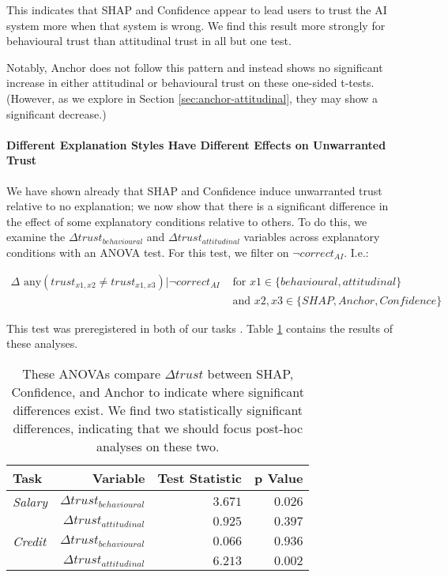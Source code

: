 This indicates that SHAP and Confidence appear to lead users to trust the AI system more when that system is wrong. We find this result more strongly for behavioural trust than attitudinal trust in all but one test.

Notably, Anchor does not follow this pattern and instead shows no significant increase in either attitudinal or behavioural trust on these one-sided t-tests. (However, as we explore in Section \ref{sec:anchor-attitudinal}, they may show a significant decrease.)

\paragraph{Different Explanation Styles Have Different Effects on Unwarranted Trust}
We have shown already that SHAP and Confidence induce unwarranted trust relative to no explanation; we now show that there is a significant difference in the effect of some explanatory conditions relative to others. To do this, we examine the $\Delta trust_{behavioural}$ and $\Delta trust_{attitudinal}$ variables across explanatory conditions with an ANOVA test. For this test, we filter on $\neg correct_{AI}$. I.e.:

\begin{equation}
    \begin{split}
        \Delta \text{ any}(trust_{x1,x2} \neq trust_{x1,x3}) | \neg correct_{AI} & \text{ for } x1 \in \{behavioural, attitudinal\} \\
        & \text{ and } x2,x3 \in \{SHAP, Anchor, Confidence\}
    \end{split}
\end{equation}

\noindent This test was preregistered in both of our tasks \cite{natarajan_binns_2022}. Table \ref{tab:delta-trust-anova} contains the results of these analyses.

\begin{table}[htb]
    \centering
    \caption{These ANOVAs compare $\Delta trust$ between SHAP, Confidence, and Anchor to indicate where significant differences exist. We find two statistically significant differences, indicating that we should focus post-hoc analyses on these two.}
    \label{tab:delta-trust-anova}
    \begin{tabular}{lrrr}
        \toprule
        Task & Variable & Test Statistic & p Value \\
        \midrule
        \emph{Salary} & $\Delta trust_{behavioural}$ & $\mathbf{3.671}$ & $\mathbf{0.026}$ \\
        & $\Delta trust_{attitudinal}$ & $0.925$ & $0.397$ \\
        \midrule
        \emph{Credit} & $\Delta trust_{behavioural}$ & $0.066$ & $0.936$ \\
        & $\Delta trust_{attitudinal}$ & $\mathbf{6.213}$ & $\mathbf{0.002}$ \\
        \bottomrule
    \end{tabular}
\end{table}

